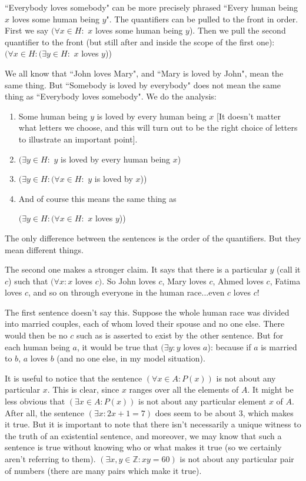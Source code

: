 \documentclass[12pt]{article}
\begin{document}
``Everybody loves somebody" can be more precisely phrased ``Every human being $x$ loves some human being $y$".  The quantifiers can be pulled to the front in order.  First we say $(\forall x \in H:$  $x$ loves some human being $y$).  Then we pull the second quantifier to the front (but still after and inside the scope of the first one):  $(\forall x \in H:(\exists y \in H:$ $x$ loves $y$))

We all know that ``John loves Mary", and ``Mary is loved by John", mean the same thing.  But ``Somebody is loved by everybody" does not mean the same thing as ``Everybody loves somebody".  We do the analysis:
\begin{enumerate}
\item Some human being $y$ is loved by every human being $x$ [It doesn't matter what letters we choose, and this will turn out to be the right choice of letters to illustrate an important point].

\item $(\exists y \in H:$ $y$ is loved by every human being $x$)

\item $(\exists y\in H:(\forall x \in H:$ $y$ is loved by $x$))

\item And of course this means the same thing as \begin{center}$(\exists y\in H:(\forall x \in H:$ $x$ loves $y$))\end{center}
\end{enumerate}

The only difference between the sentences is the order of the quantifiers.  But they mean different things.

The second one makes a stronger claim.  It says that there is a particular $y$ (call it $c$) such that $(\forall x:x$ loves $c)$.  So John loves $c$, Mary loves $c$, Ahmed loves $c$, Fatima loves $c$, and so on through everyone in the human race...even $c$ loves $c$!

The first sentence doesn't say this.  Suppose the whole human race was divided into married couples, each of whom loved their spouse and no one else.  There would then be no $c$ such as is asserted to exist by the other sentence.  But for each human being $a$, it would be true that $(\exists y:y$ loves $a$):  because if $a$ is married to $b$, $a$ loves $b$ (and no one else, in my model situation).

It is useful to notice that the sentence $(\forall x\in A:P(x))$ is not about any particular $x$.  This is clear, since $x$ ranges over all the elements of $A$.
It might be less obvious that $(\exists x\in A:P(x))$ is not about any particular element $x$ of $A$.  After all, the sentence $(\exists x:2x+1=7)$ does seem to be about 3, which makes it true.  But it is important to note that there isn't necessarily a unique witness to the truth of an existential sentence, and moreover, we may know that such a sentence is true without knowing who or what makes it true (so we certainly aren't referring to them).
$(\exists x,y\in {\mathbb Z}:xy=60)$ is  not about any particular pair of numbers (there are many pairs which make it true).
\end{document}
